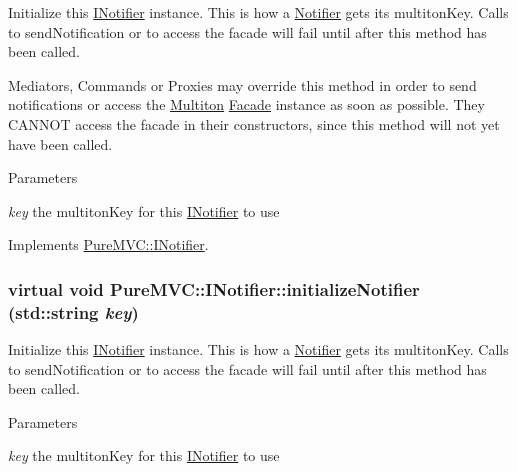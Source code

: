 Initialize this \hyperlink{class_pure_m_v_c_1_1_i_notifier}{INotifier} instance. This is how a \hyperlink{class_pure_m_v_c_1_1_notifier}{Notifier} gets its multitonKey. Calls to sendNotification or to access the facade will fail until after this method has been called.

Mediators, Commands or Proxies may override this method in order to send notifications or access the \hyperlink{class_pure_m_v_c_1_1_multiton}{Multiton} \hyperlink{class_pure_m_v_c_1_1_facade}{Facade} instance as soon as possible. They CANNOT access the facade in their constructors, since this method will not yet have been called.


\begin{DoxyParams}{Parameters}
\item[{\em key}]the multitonKey for this \hyperlink{class_pure_m_v_c_1_1_i_notifier}{INotifier} to use \end{DoxyParams}


Implements \hyperlink{class_pure_m_v_c_1_1_i_notifier_a28d7dbbe0726d4d52080546c5d79b232}{PureMVC::INotifier}.\hypertarget{class_pure_m_v_c_1_1_i_notifier_a28d7dbbe0726d4d52080546c5d79b232}{
\subsubsection[{initializeNotifier}]{\setlength{\rightskip}{0pt plus 5cm}virtual void PureMVC::INotifier::initializeNotifier (std::string {\em key})}}
\label{class_pure_m_v_c_1_1_i_notifier_a28d7dbbe0726d4d52080546c5d79b232}


Initialize this \hyperlink{class_pure_m_v_c_1_1_i_notifier}{INotifier} instance. This is how a \hyperlink{class_pure_m_v_c_1_1_notifier}{Notifier} gets its multitonKey. Calls to sendNotification or to access the facade will fail until after this method has been called.


\begin{DoxyParams}{Parameters}
\item[{\em key}]the multitonKey for this \hyperlink{class_pure_m_v_c_1_1_i_notifier}{INotifier} to use \end{DoxyParams}


